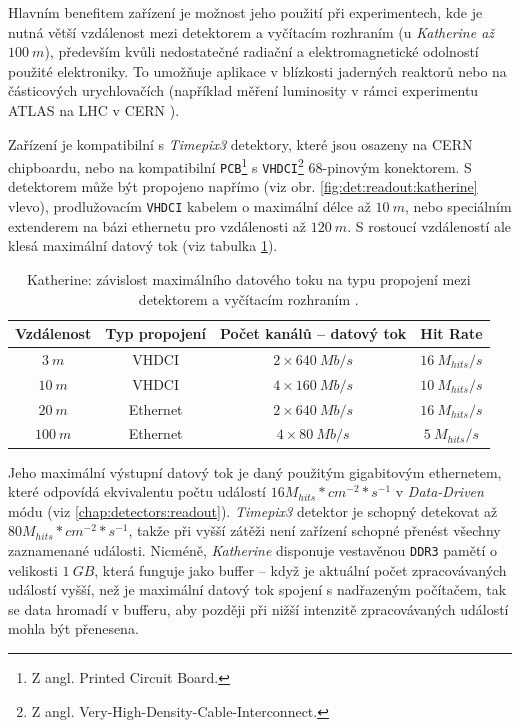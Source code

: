 Hlavním benefitem zařízení je možnost jeho použití při experimentech, kde je nutná větší vzdálenost mezi detektorem a vyčítacím rozhraním (u \textit{Katherine až $100~m$}), především kvůli nedostatečné radiační a elektromagnetické odolností použité elektroniky. To umožňuje aplikace v blízkosti jaderných reaktorů nebo na částicových urychlovačích (například měření luminosity v rámci experimentu ATLAS na LHC v CERN \cite{atlastpx_luminosity}). 

Zařízení je kompatibilní s \textit{Timepix3} detektory, které jsou osazeny na CERN chipboardu, nebo na kompatibilní \texttt{PCB}\footnote{Z angl. Printed Circuit Board.} s \texttt{VHDCI}\footnote{Z angl. Very-High-Density-Cable-Interconnect.} 68-pinovým konektorem. S detektorem může být propojeno napřímo (viz obr. \ref{fig:det:readout:katherine} vlevo), prodlužovacím \texttt{VHDCI} kabelem o maximální délce až $10~m$, nebo speciálním extenderem na bázi ethernetu pro vzdálenosti až $120~m$. S rostoucí vzdáleností ale klesá maximální datový tok (viz tabulka \ref{tab:det:katherine:data_flow}).

\begin{table}[th]
	\begin{center}
		\begin{tabular}{|c|c|c|c|}
			\hline
			\textbf{Vzdálenost} & \textbf{Typ propojení} & \textbf{Počet kanálů -- datový tok} & \textbf{Hit Rate} \\
			\hline
			$3~m$ & VHDCI & $2 \times 640~Mb/s$ & $16~M_{hits}/s$\\
			$10~m$ & VHDCI & $4 \times 160~Mb/s$ & $10~M_{hits}/s$\\
			$20~m$ & Ethernet & $2 \times 640~Mb/s$ & $16~M_{hits}/s$\\
			$100~m$ & Ethernet & $4 \times 80~Mb/s$ & $5~M_{hits}/s$\\
			\hline
		\end{tabular}
	\end{center}
	\caption{Katherine: závislost maximálního datového toku na typu propojení mezi detektorem a vyčítacím rozhraním \cite{Katherine}.}
	\label{tab:det:katherine:data_flow}
\end{table}

Jeho maximální výstupní datový tok je daný použitým gigabitovým ethernetem, které odpovídá ekvivalentu počtu událostí $16M_{hits}*cm^{-2}*s^{-1}$ v \textit{Data-Driven} módu (viz \ref{chap:detectors:readout}). \textit{Timepix3} detektor je schopný detekovat až $80M_{hits}*cm^{-2}*s^{-1}$, takže při vyšší zátěži není zařízení schopné přenést všechny zaznamenané události. Nicméně, \textit{Katherine} disponuje vestavěnou \texttt{DDR3} pamětí o velikosti $1~GB$, která funguje jako buffer -- když je aktuální počet zpracovávaných událostí vyšší, než je maximální datový tok spojení s nadřazeným počítačem, tak se data hromadí v bufferu, aby později při nižší intenzitě zpracovávaných událostí mohla být přenesena.

